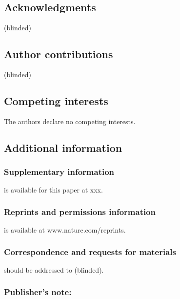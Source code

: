 \documentclass[9pt,a4paper,twocolumn,lineno]{article}
\begin{document}
\subsection*{Acknowledgments}  \small (blinded)%

\subsection*{Author contributions}
(blinded)

\subsection*{Competing interests}
The authors declare no competing interests.

\subsection*{Additional information}
\subsubsection*{Supplementary information} is available for this paper at xxx.
\subsubsection*{Reprints and permissions information} is available at www.nature.com/reprints.
\subsubsection*{Correspondence and requests for materials} should be addressed to (blinded).
\subsubsection*{Publisher’s note:} %
\newpage
\appendix
\onecolumn
\end{document}

